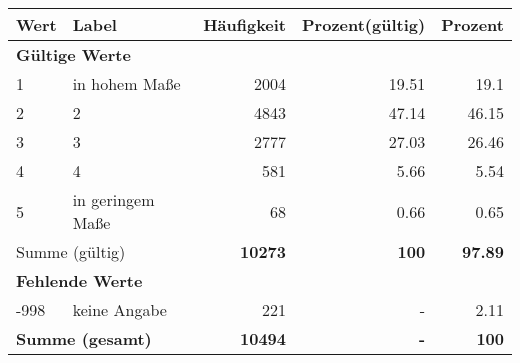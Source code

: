      \begin{longtable}{lXrrr}
     \toprule
     \textbf{Wert} & \textbf{Label} & \textbf{Häufigkeit} & \textbf{Prozent(gültig)} & \textbf{Prozent} \\
     \endhead
     \midrule
     \multicolumn{5}{l}{\textbf{Gültige Werte}}\\

     1 &
     \multicolumn{1}{X}{ in hohem Maße   } &


       \num{2004} &
       \num[round-mode=places,round-precision=2]{19,51} &
         \num[round-mode=places,round-precision=2]{19,1} \\

     2 &
     \multicolumn{1}{X}{ 2   } &


       \num{4843} &
       \num[round-mode=places,round-precision=2]{47,14} &
         \num[round-mode=places,round-precision=2]{46,15} \\

     3 &
     \multicolumn{1}{X}{ 3   } &


       \num{2777} &
       \num[round-mode=places,round-precision=2]{27,03} &
         \num[round-mode=places,round-precision=2]{26,46} \\

     4 &
     \multicolumn{1}{X}{ 4   } &


       \num{581} &
       \num[round-mode=places,round-precision=2]{5,66} &
         \num[round-mode=places,round-precision=2]{5,54} \\

     5 &
     \multicolumn{1}{X}{ in geringem Maße   } &


       \num{68} &
       \num[round-mode=places,round-precision=2]{0,66} &
         \num[round-mode=places,round-precision=2]{0,65} \\
     \midrule
     \multicolumn{2}{l}{Summe (gültig)} &
       \textbf{\num{10273}} &
     \textbf{100} &
       \textbf{\num[round-mode=places,round-precision=2]{97,89}} \\
     \multicolumn{5}{l}{\textbf{Fehlende Werte}}\\
       -998 &
       keine Angabe &
         \num{221} &
        - &
         \num[round-mode=places,round-precision=2]{2,11} \\
     \midrule
     \multicolumn{2}{l}{\textbf{Summe (gesamt)}} &
          \textbf{\num{10494}} &
        \textbf{-} &
        \textbf{100} \\
     \bottomrule
     \end{longtable}
     
